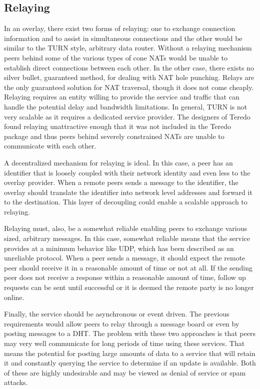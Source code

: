 \documentclass[conference]{IEEEtran}
\begin{document}
\subsection{Relaying}
\label{relay}

In an overlay, there exist two forms of relaying:  one to exchange connection
information and to assist in simultaneous connections and the other would be
similar to the TURN style, arbitrary data router.  Without a relaying mechanism
peers behind some of the various types of cone NATs would be unable to
establish direct connections between each other.  In the other case, there
exists no silver bullet, guaranteed method, for dealing with NAT hole punching.
Relays are the only guaranteed solution for NAT traversal, though it does not
come cheaply.  Relaying requires an entity willing to provide the service and
traffic that can handle the potential delay and bandwidth limitations.  In
general, TURN is not very scalable as it requires a dedicated service provider.
The designers of Teredo found relaying unattractive enough that it was not
included in the Teredo package and thus peers behind severely constrained NATs
are unable to communicate with each other.

A decentralized mechanism for relaying is ideal.  In this case, a peer has an
identifier that is loosely coupled with their network identity and even less to
the overlay provider.  When a remote peers sends a message to the identifier,
the overlay should translate the identifier into network level addresses and
forward it to the destination.  This layer of decoupling could enable a
scalable approach to relaying.  

Relaying must, also, be a somewhat reliable enabling peers to exchange various
sized, arbitrary messages.  In this case, somewhat reliable means that the
service provides at a minimum behavior like UDP, which has been described as an
unreliable protocol.  When a peer sends a message, it should expect the remote
peer should receive it in a reasonable amount of time or not at all.  If the
sending peer does not receive a response within a reasonable amount of time,
follow up requests can be sent until successful or it is deemed the remote
party is no longer online.  

Finally, the service should be asynchronous or event driven.  The previous
requirements would allow peers to relay through a message board or even by
posting messages to a DHT.  The problem with these two approaches is that peers
may very well communicate for long periods of time using these services.  That
means the potential for posting large amounts of data to a service that will
retain it and constantly querying the service to determine if an update is
available.  Both of these are highly undesirable and may be viewed as denial of
service or spam attacks.
\end{document}
